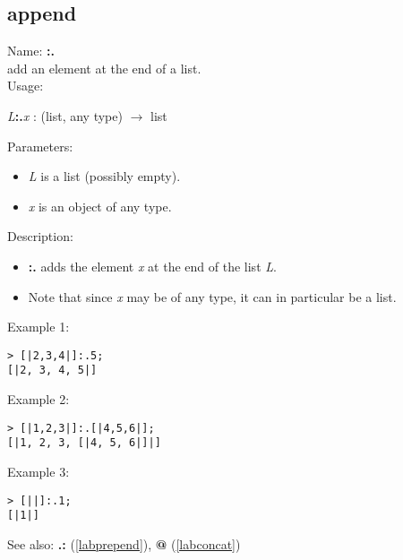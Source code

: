 \subsection{append}
\label{labappend}
\noindent Name: \textbf{:.}\\
add an element at the end of a list.\\
\noindent Usage: 
\begin{center}
\emph{L}\textbf{:.}\emph{x} : (\textsf{list}, \textsf{any type}) $\rightarrow$ \textsf{list}
\\ 
\end{center}
Parameters: 
\begin{itemize}
\item \emph{L} is a list (possibly empty).
\item \emph{x} is an object of any type.
\end{itemize}
\noindent Description: \begin{itemize}

\item \textbf{:.} adds the element \emph{x} at the end of the list \emph{L}.

\item Note that since \emph{x} may be of any type, it can in particular be a list.
\end{itemize}
\noindent Example 1: 
\begin{center}\begin{minipage}{15cm}\begin{Verbatim}[frame=single]
> [|2,3,4|]:.5;
[|2, 3, 4, 5|]
\end{Verbatim}
\end{minipage}\end{center}
\noindent Example 2: 
\begin{center}\begin{minipage}{15cm}\begin{Verbatim}[frame=single]
> [|1,2,3|]:.[|4,5,6|];
[|1, 2, 3, [|4, 5, 6|]|]
\end{Verbatim}
\end{minipage}\end{center}
\noindent Example 3: 
\begin{center}\begin{minipage}{15cm}\begin{Verbatim}[frame=single]
> [||]:.1;
[|1|]
\end{Verbatim}
\end{minipage}\end{center}
See also: \textbf{.:} (\ref{labprepend}), \textbf{@} (\ref{labconcat})
